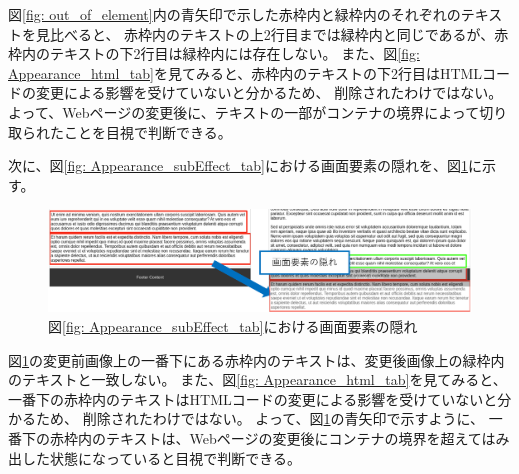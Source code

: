 図\ref{fig: out_of_element}内の青矢印で示した赤枠内と緑枠内のそれぞれのテキストを見比べると、
赤枠内のテキストの上2行目までは緑枠内と同じであるが、赤枠内のテキストの下2行目は緑枠内には存在しない。
また、図\ref{fig: Appearance_html_tab}を見てみると、赤枠内のテキストの下2行目はHTMLコードの変更による影響を受けていないと分かるため、
削除されたわけではない。
よって、Webページの変更後に、テキストの一部がコンテナの境界によって切り取られたことを目視で判断できる。
\par
次に、図\ref{fig: Appearance_subEffect_tab}における画面要素の隠れを、図\ref{fig: hidden_element}に示す。
\begin{figure}[tp]
    \begin{center}
        \includegraphics[width=1.0\columnwidth]{image/3_hidden_element2.png}
        \caption{図\ref{fig: Appearance_subEffect_tab}における画面要素の隠れ}
        \label{fig: hidden_element}
    \end{center}
\end{figure}
図\ref{fig: hidden_element}の変更前画像上の一番下にある赤枠内のテキストは、変更後画像上の緑枠内のテキストと一致しない。
また、図\ref{fig: Appearance_html_tab}を見てみると、
一番下の赤枠内のテキストはHTMLコードの変更による影響を受けていないと分かるため、
削除されたわけではない。
よって、図\ref{fig: hidden_element}の青矢印で示すように、
一番下の赤枠内のテキストは、Webページの変更後にコンテナの境界を超えてはみ出した状態になっていると目視で判断できる。
